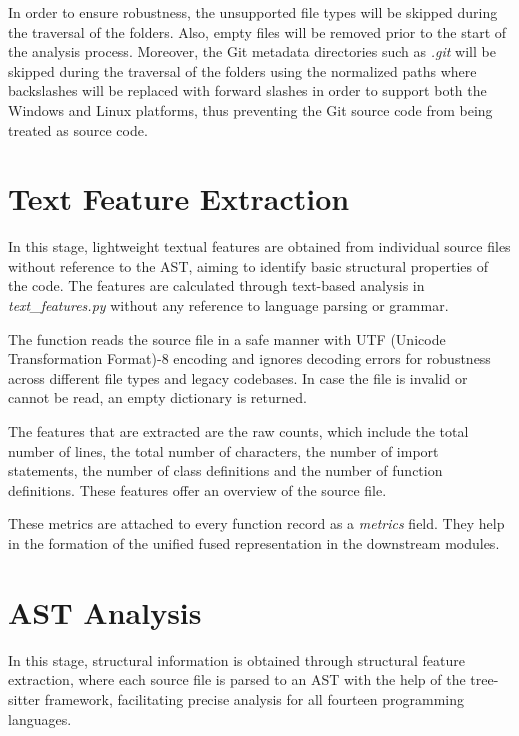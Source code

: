 \par In order to ensure robustness, the unsupported file types will be skipped during the traversal of the folders. Also, empty files will be removed prior to the start of the analysis process. Moreover, the Git metadata directories such as \textit{.git} will be skipped during the traversal of the folders using the normalized paths where backslashes will be replaced with forward slashes in order to support both the Windows and Linux platforms, thus preventing the Git source code from being treated as source code.

\section{Text Feature Extraction}
\hspace{0.5cm}
In this stage, lightweight textual features are obtained from individual source files without reference to the AST, aiming to identify basic structural properties of the code. The features are calculated through text-based analysis in \textit{text\_features.py} without any reference to language parsing or grammar.

\par The function reads the source file in a safe manner with UTF (Unicode Transformation Format)-8 encoding and ignores decoding errors for robustness across different file types and legacy codebases. In case the file is invalid or cannot be read, an empty dictionary is returned.

\par The features that are extracted are the raw counts, which include the total number of lines, the total number of characters, the number of import statements, the number of class definitions and the number of function definitions. These features offer an overview of the source file.

\par These metrics are attached to every function record as a \textit{metrics} field. They help in the formation of the unified fused representation in the downstream modules.

\section{AST Analysis}
\hspace{0.5cm}
In this stage, structural information is obtained through structural feature extraction, where each source file is parsed to an AST with the help of the tree-sitter framework, facilitating precise analysis for all fourteen programming languages.

